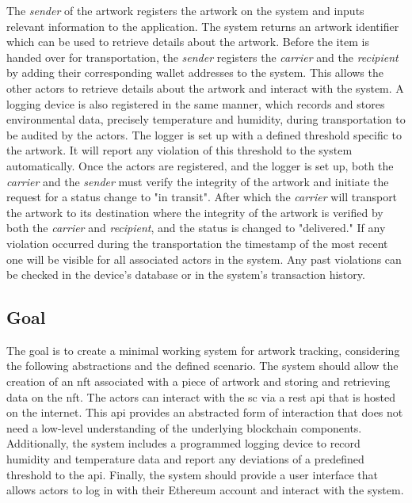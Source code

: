 The \textit{sender} of the artwork registers the artwork on the system and inputs relevant information to the application. The system returns an artwork identifier which can be used to retrieve details about the artwork. Before the item is handed over for transportation, the \textit{sender} registers the \textit{carrier} and the \textit{recipient} by adding their corresponding wallet addresses to the system. This allows the other actors to retrieve details about the artwork and interact with the system. A logging device is also registered in the same manner, which records and stores environmental data, precisely temperature and humidity, during transportation to be audited by the actors. The logger is set up with a defined threshold specific to the artwork. It will report any violation of this threshold to the system automatically. Once the actors are registered, and the logger is set up, both the \textit{carrier} and the \textit{sender} must verify the integrity of the artwork and initiate the request for a status change to "in transit". After which the \textit{carrier} will transport the artwork to its destination where the integrity of the artwork is verified by both the \textit{carrier} and \textit{recipient}, and the status is changed to "delivered." If any violation occurred during the transportation the timestamp of the most recent one will be visible for all associated actors in the system. Any past violations can be checked in the device's database or in the system's transaction history.

\subsection*{Goal}
The goal is to create a minimal working system for artwork tracking, considering the following abstractions and the defined scenario. The system should allow the creation of an \gls{nft} associated with a piece of artwork and storing and retrieving data on the \gls{nft}. The actors can interact with the \gls{sc} via a \gls{rest} \gls{api} that is hosted on the internet. This \gls{api} provides an abstracted form of interaction that does not need a low-level understanding of the underlying blockchain components. Additionally, the system includes a programmed logging device to record humidity and temperature data and report any deviations of a predefined threshold to the \gls{api}. Finally, the system should provide a user interface that allows actors to log in with their Ethereum account and interact with the system.

